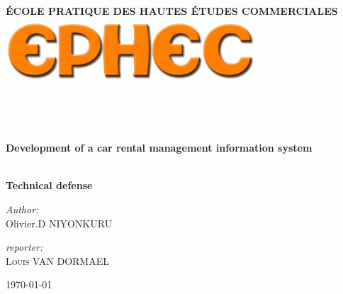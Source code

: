\begin{titlepage}
\begin{center}

\textsc{\LARGE \textbf{\'{E}COLE PRATIQUE DES HAUTES ÉTUDES COMMERCIALES}}\\[0.4cm]

\includegraphics[width=0.7\textwidth]{ephec.png}~\\[0.4cm]

\\
\\[1.5cm]

\textsc{\Large }\\[0.5cm]

\HRule \\[0.4cm]

{\huge \bfseries Development of a car rental management information system \\[0.4cm] }

\HRule \\[0.5cm]

\textbf{Technical defense}

\vspace{1.cm}

\begin{minipage}{0.4\textwidth}
\begin{flushleft} \large
\emph{Author:}\\
Olivier.D NIYONKURU\\
\end{flushleft}
\end{minipage}
\begin{minipage}{0.4\textwidth}
\begin{flushright} \large
\emph{reporter:} \\
\textsc{Louis VAN DORMAEL}
\end{flushright}
\end{minipage}

\vfill

{\large \today}

\end{center}
\end{titlepage}